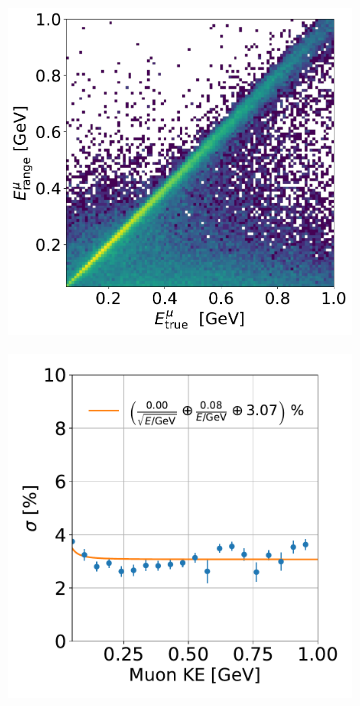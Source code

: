 \documentclass[a4paper]{article}
\begin{document}
\begin{figure}[H]
\begin{center}
\begin{subfigure}[b]{0.38\textwidth}
    \end{subfigure}
    \begin{subfigure}[b]{0.4\textwidth}
    \centering
    \includegraphics[width=1.00\textwidth]{ereco/muon_range_eres2D.pdf}
    \end{subfigure}
    \begin{subfigure}[b]{0.38\textwidth}
    \centering
    \includegraphics[width=1.00\textwidth]{ereco/muon_range_eres_vs_true.pdf}

\end{subfigure}
\end{center}
\end{figure}
\end{document}
